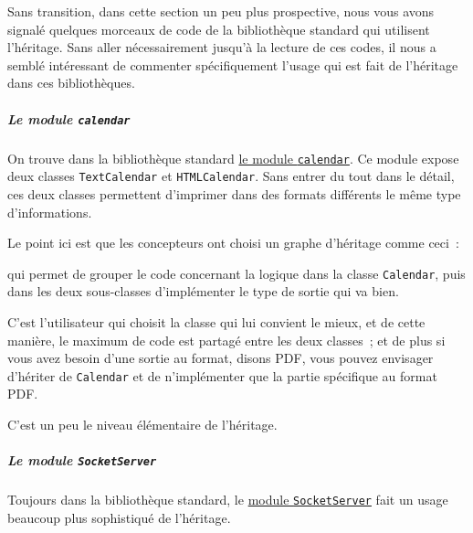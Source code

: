     Sans transition, dans cette section un peu plus prospective, nous vous
avons signalé quelques morceaux de code de la bibliothèque standard qui
utilisent l'héritage. Sans aller nécessairement jusqu'à la lecture de
ces codes, il nous a semblé intéressant de commenter spécifiquement
l'usage qui est fait de l'héritage dans ces bibliothèques.

    \hypertarget{le-module-calendar}{%
\subparagraph{\texorpdfstring{Le module
\texttt{calendar}}{Le module calendar}}\label{le-module-calendar}}

    On trouve dans la bibliothèque standard
\href{https://docs.python.org/3/library/calendar.html}{le module
\texttt{calendar}}. Ce module expose deux classes \texttt{TextCalendar}
et \texttt{HTMLCalendar}. Sans entrer du tout dans le détail, ces deux
classes permettent d'imprimer dans des formats différents le même type
d'informations.

Le point ici est que les concepteurs ont choisi un graphe d'héritage
comme ceci~:

\begin{Shaded}
\begin{Highlighting}[frame=lines,framerule=0.6mm,rulecolor=\color{asisframecolor}]
    \OperatorTok{|--}
    \OperatorTok{|--}
\end{Highlighting}
\end{Shaded}

qui permet de grouper le code concernant la logique dans la classe
\texttt{Calendar}, puis dans les deux sous-classes d'implémenter le type
de sortie qui va bien.

C'est l'utilisateur qui choisit la classe qui lui convient le mieux, et
de cette manière, le maximum de code est partagé entre les deux
classes~; et de plus si vous avez besoin d'une sortie au format, disons
PDF, vous pouvez envisager d'hériter de \texttt{Calendar} et de
n'implémenter que la partie spécifique au format PDF.

C'est un peu le niveau élémentaire de l'héritage.

    \hypertarget{le-module-socketserver}{%
\subparagraph{\texorpdfstring{Le module
\texttt{SocketServer}}{Le module SocketServer}}\label{le-module-socketserver}}

    Toujours dans la bibliothèque standard, le
\href{https://docs.python.org/3/library/socketserver.html}{module
\texttt{SocketServer}} fait un usage beaucoup plus sophistiqué de
l'héritage.

